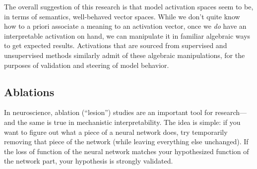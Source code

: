 The overall suggestion of this research is
that model activation spaces seem to be, in terms of semantics, well-behaved
vector spaces. While we don't quite know how to a priori associate a meaning to
an activation vector, once we \emph{do} have an interpretable activation on
hand, we can manipulate it in familiar algebraic ways to get expected results.
Activations that are sourced from supervised and unsupervised methods similarly
admit of these algebraic manipulations, for the purposes of validation and
steering of model behavior.


\subsection{Ablations}\label{ablations}
In neuroscience, ablation (``lesion'') studies are an important tool for
research---and the same is true in mechanistic interpretability. The idea is
simple: if you want to figure out what a piece of a neural network does, try
temporarily removing that piece of the network (while leaving everything else
unchanged). If the loss of function of the neural network matches your
hypothesized function of the network part, your hypothesis is strongly
validated.

